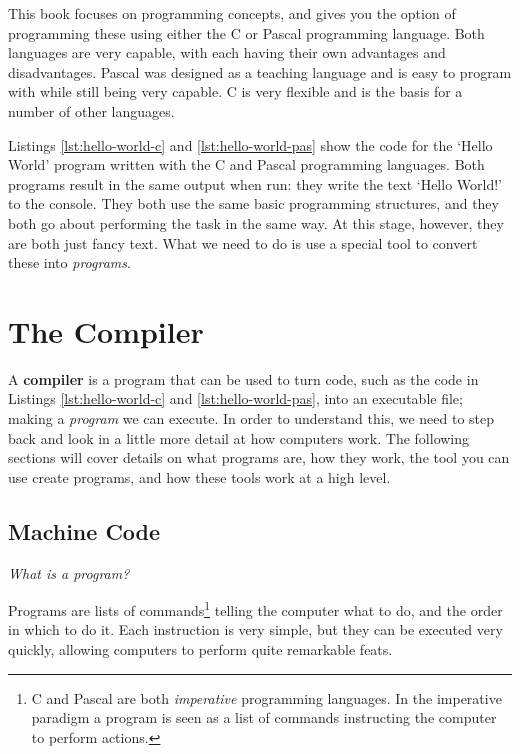 This book focuses on programming concepts, and gives you the option of programming these using either the C or Pascal programming language. Both languages are very capable, with each having their own advantages and disadvantages. Pascal was designed as a teaching language and is easy to program with while still being very capable. C is very flexible and is the basis for a number of other languages.

\begin{multicols}{2}
  \columnbreak
\end{multicols}

Listings \ref{lst:hello-world-c} and \ref{lst:hello-world-pas} show the code for the `Hello World' program written with the C and Pascal programming languages. Both programs result in the same output when run: they write the text `Hello World!' to the console. They both use the same basic programming structures, and they both go about performing the task in the same way. At this stage, however, they are both just fancy text. What we need to do is use a special tool to convert these into \emph{programs}.


\clearpage
\section{The Compiler} %
\label{sec:the_compiler}

A \textbf{compiler} is a program that can be used to turn code, such as the code in Listings \ref{lst:hello-world-c} and \ref{lst:hello-world-pas}, into an executable file; making a \emph{program} we can execute. In order to understand this, we need to step back and look in a little more detail at how computers work. The following sections will cover details on what programs are, how they work, the tool you can use create programs, and how these tools work at a high level.

\subsection{Machine Code} %
\label{sub:machine_code}

\emph{What is a program?}

Programs are lists of commands\footnote{C and Pascal are both \emph{imperative} programming languages. In the imperative paradigm a program is seen as a list of commands instructing the computer to perform actions.} telling the computer what to do, and the order in which to do it. Each instruction is very simple, but they can be executed very quickly, allowing computers to perform quite remarkable feats.


